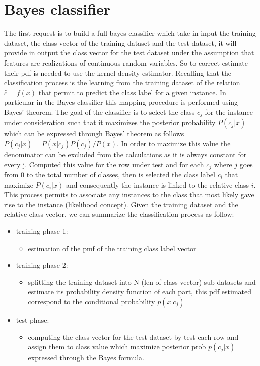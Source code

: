 \documentclass[12pt]{report}
\begin{document}
\section{Bayes classifier}
The first request is to build a full bayes classifier which take in input the training dataset, the class vector of the training dataset and the test dataset, it will provide in output the class vector for the test dataset under the assumption that features are realizations of continuous random variables. So to correct estimate their pdf is needed to use the kernel density estimator. Recalling that the classification process is the learning from the training dataset of the relation $\hat{c} = f(x) $ that permit to predict the class label for a given instance. In particular in the Bayes classifier this mapping procedure is performed using Bayes' theorem. The goal of the classifier is to select the class $c_{j}$ for the instance under consideration such that it maximizes the posterior probability $P(c_{j}|x)$ which can be expressed through Bayes' theorem as follows 
$P(c_{j}|x) = P(x|c_{j}) P(c_{j})/ P(x)$. In order to maximize this value the denominator can be excluded from the calculations as it is always constant for every j.
Computed this value for the row under test and for each $c_{j}$ where $j$ goes from 0 to the total number of classes, then is selected the class label $c_{i}$ that maximize $P(c_{i}|x)$ and consequently the instance is linked to the relative class $i$.
This process permits to associate any instances to the class that most likely gave rise to the instance (likelihood concept).
Given the training dataset and the relative class vector, we can summarize the classification process as follow:

\begin{itemize}
\item training phase 1:
    \begin{itemize}
        \item estimation of the pmf of the training class label vector
    \end{itemize} \newpage
\item training phase 2:
    \begin{itemize}
        \item splitting the training dataset into N (len of class vector) sub datasets and estimate its probability density function of each part, this pdf estimated correspond to the conditional probability $p(x|c_{j})$
    \end{itemize}
\item test phase:
    \begin{itemize}
        \item  computing the class vector for the test dataset by test each row and assign them to class value which maximize posterior prob $p(c_{j}|x)$ expressed through the Bayes formula.
    \end{itemize}
\end{itemize}
\end{document}
